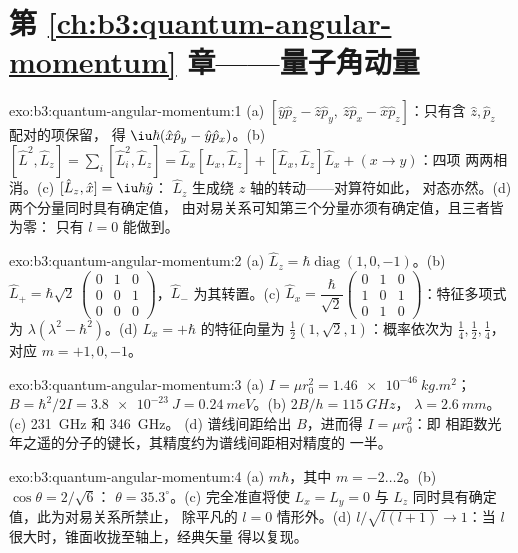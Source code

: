  \section*{第 \ref{ch:b3:quantum-angular-momentum} 章——量子角动量}

\begin{solution}{exo:b3:quantum-angular-momentum:1}
(a) $[\hat y\hat p_z - \hat z\hat p_y,\ \hat z\hat p_x - \hat x\hat
p_z]$：只有含 $\hat z, \hat p_z$ 配对的项保留，
得 $\iu\hbar(\hat x\hat p_y - \hat y\hat p_x)$。(b) $[\hat
L^2, \hat L_z] = \sum_i[\hat L_i^2, \hat L_z] = \hat L_x[\hat L_x,
\hat L_z] + [\hat L_x, \hat L_z]\hat L_x + (x \to y)$：四项
两两相消。(c) $[\hat L_z, \hat x] = \iu\hbar\hat y$：
$\hat L_z$ 生成绕 $z$ 轴的转动——对算符如此，
对态亦然。(d) 两个分量同时具有确定值，
由对易关系可知第三个分量亦须有确定值，且三者皆为零：
只有 $l = 0$ 能做到。
\end{solution}

\begin{solution}{exo:b3:quantum-angular-momentum:2}
(a) $\hat L_z = \hbar\operatorname{diag}(1, 0, -1)$。(b) $\hat L_+ =
\hbar\sqrt2\,\begin{pmatrix}0&1&0\\0&0&1\\0&0&0
\end{pmatrix}$，$\hat L_-$ 为其转置。(c) $\hat L_x =
\dfrac{\hbar}{\sqrt2}\begin{pmatrix}0&1&0\\1&0&1\\0&1&0
\end{pmatrix}$：特征多项式为 $\lambda(\lambda^2 -
\hbar^2)$。(d) $L_x = +\hbar$ 的特征向量为 $\tfrac12(1,
\sqrt2, 1)$：概率依次为 $\tfrac14, \tfrac12, \tfrac14$，对应 $m =
+1, 0, -1$。
\end{solution}

\begin{solution}{exo:b3:quantum-angular-momentum:3}
(a) $I = \mu r_0^2 = \qty{1.46e-46}{kg.m^2}$；$B = \hbar^2/2I =
\qty{3.8e-23}{J} = \qty{0.24}{meV}$。(b) $2B/h = \qty{115}{GHz}$，
$\lambda = \qty{2.6}{mm}$。(c) \qty{231}{GHz} 和 \qty{346}{GHz}。
(d) 谱线间距给出 $B$，进而得 $I = \mu r_0^2$：即
相距数光年之遥的分子的键长，其精度约为谱线间距相对精度的
一半。
\end{solution}

\begin{solution}{exo:b3:quantum-angular-momentum:4}
(a) $m\hbar$，其中 $m = -2 \dots 2$。(b) $\cos\theta = 2/\sqrt6$：
$\theta = 35.3^\circ$。(c) 完全准直将使 $L_x = L_y
= 0$ 与 $L_z$ 同时具有确定值，此为对易关系所禁止，
除平凡的 $l = 0$ 情形外。(d) $l/\sqrt{l(l+1)} \to 1$：当
$l$ 很大时，锥面收拢至轴上，经典矢量
得以复现。
\end{solution}

